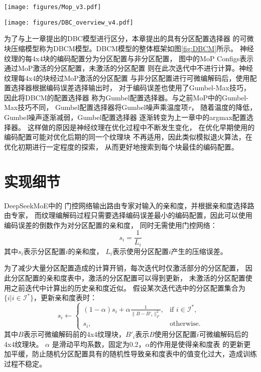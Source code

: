 \begin{figure*}[htbp]
    \centering
    \texttt{[image: figures/Mop\_v3.pdf]}
    \caption{基于混合专家模型的分区配置选择器(MoP)}
    \label{fig:Mop}
\end{figure*}

\begin{figure*}[htbp]
    \centering
    \texttt{[image: figures/DBC\_overview\_v4.pdf]}
    \caption{基于MoP的DBCM模型的整体框架}
    \label{fig:DBCM}
\end{figure*}

为了与上一章提出的DBC模型进行区分，本章提出的具有分区配置选择器
的可微块压缩模型称为DBCM模型。DBCM模型的整体框架如图\ref{fig:DBCM}所示。
神经纹理的每4x4块的编码配置分为分区配置与非分区配置，
图中的MoP Configs表示通过MoP激活的分区配置，未激活的分区配置
则在此次迭代中不进行计算。神经纹理每4x4的块经过MoP激活的分区配置
与非分区配置进行可微编解码后，使用配置选择器根据编码误差选择输出时，
对于编码误差也使用了Gumbel-Max技巧，因此将DBCM的配置选择器
称为Gumbel配置选择器。与之前MoP中的Gumbel-Max技巧不同，
Gumbel配置选择器将Gumbel噪声乘温度项$\tau$，
随着温度的降低，Gumbel噪声逐渐减弱，Gumbel配置选择器
逐渐转变为上一章中的argmax配置选择器。
这样做的原因是神经纹理在优化过程中不断发生变化，
在优化早期使用的编码配置可能对优化后期的同一个纹理块
不再适用，因此类似模拟退火算法，在优化初期进行一定程度的探索，
从而更好地搜索到每个块最佳的编码配置。

\section{实现细节}

DeepSeekMoE\cite{dai2024deepseekmoe}中的
门控网络输出路由专家对输入的亲和度，并根据亲和度选择路由专家，
而纹理编解码过程只需要选择编码误差最小的编码配置，因此可以使用编码误差的倒数作为对分区配置的亲和度，
同时无需使用门控网络：
\begin{equation}
s_i=\frac{1}{L_i}
\end{equation}
其中$s_i$表示分区配置$i$的亲和度，
$L_i$表示使用分区配置$i$产生的压缩误差。

为了减少大量分区配置造成的计算开销，每次迭代时仅激活部分的分区配置，
因此分区配置的亲和度表中，激活的分区配置可以得到更新，
未激活的分区配置使用之前迭代中计算出的历史亲和度近似。
假设某次迭代选中的分区配置集合为$\{i|i\in\mathcal{I}^*\}$，更新亲和度表时：
\begin{equation}
    s_i\leftarrow
    \begin{cases} 
        (1-\alpha)s_i+\alpha\frac{1}{\|B-B'_i\|_F^2}, & \text{if } i\in\mathcal{I}^*,\\
    s_i, & \text{otherwise}.
    \end{cases}
\end{equation}
其中$B$表示可微编解码前的4x4纹理块，$B'_i$表示$B$使用分区配置$i$可微编解码后的4x4纹理块。
$\alpha$ 是滑动平均系数，固定为0.2，$\alpha$的作用是使得亲和度表
的更新更加平缓，防止随机分区配置具有的随机性导致亲和度表中的值变化过大，造成训练过程不稳定。

